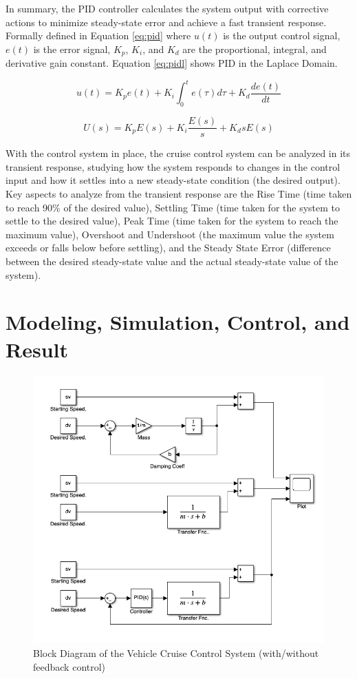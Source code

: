 \documentclass{article}
\begin{document}
In summary, the PID controller calculates the system output with corrective actions to minimize steady-state error and achieve a fast transient response. Formally defined in Equation \ref{eq:pid} where $u(t)$ is the output control signal, $e(t)$ is the error signal, $K_p$, $K_i$, and $K_d$ are the proportional, integral, and derivative gain constant. Equation \ref{eq:pidl} shows PID in the Laplace Domain.

\begin{equation}
    u(t) = K_p e(t) + K_i \int_0^t e(\tau) d\tau + K_d \frac{de(t)}{dt}
    \label{eq:pid}
\end{equation}

\begin{equation}
    U(s) = K_p E(s) + K_i \frac{E(s)}{s} + K_d s E(s)
    \label{eq:pidl}
\end{equation}

With the control system in place, the cruise control system can be analyzed in its transient response, studying how the system responds to changes in the control input and how it settles into a new steady-state condition (the desired output). Key aspects to analyze from the transient response are the Rise Time (time taken to reach 90\% of the desired value), Settling Time (time taken for the system to settle to the desired value), Peak Time (time taken for the system to reach the maximum value), Overshoot and Undershoot (the maximum value the system exceeds or falls below before settling), and the Steady State Error (difference between the desired steady-state value and the actual steady-state value of the system).

\section{Modeling, Simulation, Control, and Result}

\begin{figure}[H]
    \centering
    \includegraphics[width=0.8\linewidth]{img/block_diagram.png}
    \caption{Block Diagram of the Vehicle Cruise Control System (with/without feedback control)}
    \label{fig:block}
\end{figure}
\end{document}
